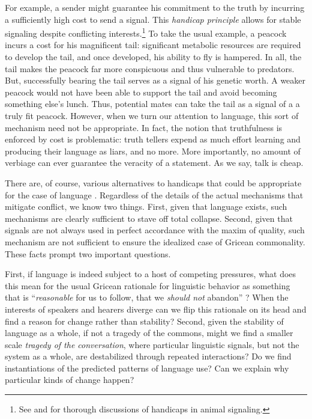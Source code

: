 \documentclass[linguex]{sp}
\theoremstyle{definition} \newtheorem{definition}{Definition}
\begin{document}
For example, a sender might guarantee his commitment to the truth by incurring a sufficiently high cost to send a signal. This \emph{handicap principle}  \citep{Zahavi:1975} allows for stable signaling despite conflicting interests.\footnote{See \cite{maynard-smith-harper:2004} and \cite{searcy-nowicki:2005} for thorough discussions of handicaps in animal signaling.} To take the usual example, a peacock incurs a cost for his magnificent tail: significant metabolic resources are required to develop the tail, and once developed, his ability to fly is hampered. In all, the tail makes the peacock far more conspicuous and thus vulnerable to predators. But, successfully bearing the tail serves as a signal of his genetic worth. A weaker peacock would not have been able to support the tail and avoid becoming something else's lunch. Thus, potential mates  can take the tail as a signal of a a truly fit peacock. However, when we turn our attention to language, this sort of mechanism need not be appropriate.  In fact, the notion that truthfulness is enforced by cost is problematic: truth tellers expend as much effort learning and producing their language as liars, and no more. More importantly, no amount of verbiage can ever guarantee the veracity of a statement. As we say, talk is cheap. 

There are, of course, various alternatives to handicaps that could be appropriate for the case of language \citep{scott-phillips:2008}. Regardless of the details of the actual mechanisms that mitigate conflict, we know two things. First, given that language exists, such mechanisms are clearly sufficient to stave off total collapse. Second, given that signals are not always used in perfect accordance with the maxim of quality, such mechanism are not sufficient to ensure the idealized case of Gricean commonality. These facts prompt two important questions.

First, if language is indeed subject to a host of competing pressures, what does this mean for the usual Gricean rationale for linguistic behavior as something that is ``\emph{reasonable} for us to follow, that we \emph{should not} abandon'' \citep[29]{grice1975}? When the interests of speakers and hearers diverge can we flip this rationale on its head and find a reason for change rather than stability? Second, given the stability of language as a whole, if not a tragedy of the commons, might we find a smaller scale \emph{tragedy of the conversation}, where particular linguistic signals, but not the system as a whole, are destabilized through repeated interactions? Do we find instantiations of the predicted patterns of language use? Can we explain why particular kinds of change happen?
\end{document}
